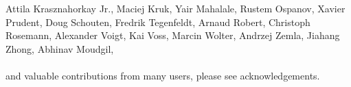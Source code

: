 \begin{center}
{Attila Krasznahorkay Jr., %
Maciej Kruk, %
Yair Mahalale, %
Rustem Ospanov, %
Xavier Prudent, %
Doug Schouten, %
Fredrik Tegenfeldt, %
Arnaud Robert, %
Christoph Rosemann, %
Alexander Voigt, %
Kai Voss, %
Marcin Wolter, %
Andrzej Zemla, %
Jiahang Zhong, %
Abhinav Moudgil, %
\\
\hspace{0.5cm} \\
and valuable contributions from many users, please see acknowledgements.
}
\end{center}

\thispagestyle{empty}
\newpage

